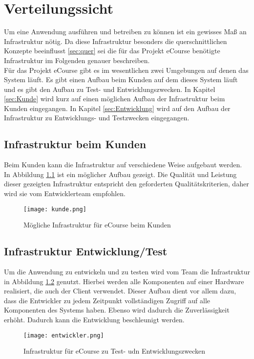 \chapter{Verteilungssicht}
Um eine Anwendung ausführen und betreiben zu können ist ein gewisses Maß an Infrastruktur nötig. Da diese Infrastruktur besonders die querschnittlichen Konzepte beeinflusst \ref{sec:quer} sei die für das Projekt eCourse benötigte Infrastruktur im Folgenden genauer beschreiben. \\

Für das Projekt eCourse gibt es im wesentlichen zwei Umgebungen auf denen das System läuft. Es gibt einen Aufbau beim Kunden auf dem dieses System läuft und es gibt den Aufbau zu Test- und Entwicklungszwecken. In Kapitel \ref{sec:Kunde} wird kurz auf einen möglichen Aufbau der Infrastruktur beim Kunden eingegangen. In Kapitel \ref{sec:Entwicklung} wird auf den Aufbau der Infrastruktur zu Entwicklungs- und Testzwecken eingegangen.
\section{Infrastruktur beim Kunden}
Beim Kunden kann die Infrastruktur auf verschiedene Weise aufgebaut werden. In Abbildung \ref{fib:Kunde} ist ein möglicher Aufbau gezeigt. Die Qualität und Leistung dieser gezeigten Infrastruktur entspricht den geforderten Qualitätskriterien, daher wird sie vom Entwicklerteam empfohlen.

\begin{figure}[H]
\centering
\texttt{[image: kunde.png]}
\caption{Mögliche Infrastruktur für eCourse beim Kunden}
\label{fib:Kunde}
\end{figure}


\section{Infrastruktur Entwicklung/Test}
Um die Anwendung zu entwickeln und zu testen wird vom Team die Infrastruktur in Abbildung \ref{fib:Entwickler} genutzt. Hierbei werden alle Komponenten auf einer Hardware realisiert, die auch der Client verwendet. Dieser Aufbau dient vor allem dazu, dass die Entwickler zu jedem Zeitpunkt vollständigen Zugriff auf alle Komponenten des Systems haben. Ebenso wird dadurch die Zuverlässigkeit erhöht. Dadurch kann die Entwicklung beschleunigt werden.

\begin{figure}[H]
\centering
\texttt{[image: entwickler.png]}
\caption{Infrastruktur für eCourse zu Test- udn Entwicklungszwecken}
\label{fib:Entwickler}
\end{figure}